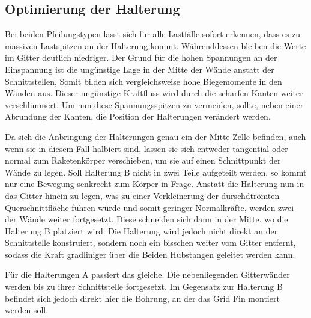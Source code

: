 \subsection{Optimierung der Halterung}
Bei beiden Pfeilungstypen lässt sich für alle Lastfälle sofort erkennen, dass es zu massiven Lastspitzen an der Halterung kommt. Währenddessen bleiben die Werte im Gitter deutlich niedriger. Der Grund für die hohen Spannungen an der Einspannung ist die ungünstige Lage in der Mitte der Wände anstatt der Schnittstellen, Somit bilden sich vergleichsweise hohe Biegemomente in den Wänden aus. Dieser ungünstige Kraftfluss wird durch die scharfen Kanten weiter verschlimmert. Um nun diese Spannungsspitzen zu vermeiden, sollte, neben einer Abrundung der Kanten, die Position der Halterungen verändert werden.

Da sich die Anbringung der Halterungen genau ein der Mitte Zelle befinden, auch wenn sie in diesem Fall halbiert sind, lassen sie sich entweder tangential oder normal zum Raketenkörper verschieben, um sie auf einen Schnittpunkt der Wände zu legen. Soll Halterung B nicht in zwei Teile aufgeteilt werden, so kommt nur eine Bewegung senkrecht zum Körper in Frage. Anstatt die Halterung nun in das Gitter hinein zu legen, was zu einer Verkleinerung der durschdtrömten Querschnittfläche führen würde und somit geringer Normalkräfte, werden zwei der Wände weiter fortgesetzt. Diese schneiden sich dann in der Mitte, wo die Halterung B platziert wird. Die Halterung wird jedoch nicht direkt an der Schnittstelle konstruiert, sondern noch ein bisschen weiter vom Gitter entfernt, sodass die Kraft gradliniger über die Beiden Hubstangen geleitet werden kann.

Für die Halterungen A passiert das gleiche. Die nebenliegenden Gitterwänder werden bis zu ihrer Schnittstelle fortgesetzt. Im Gegensatz zur Halterung B befindet sich jedoch direkt hier die Bohrung, an der das Grid Fin montiert werden soll.
